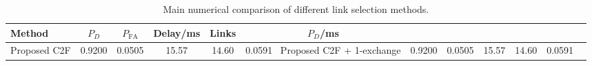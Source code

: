 \begin{table}[t]
    \centering
    \caption{Main numerical comparison of different link selection methods.}
    \label{tab:main_summary}
    \begin{tabular}{l c c c c c}
        \hline
        Method & $P_D$ & $P_{\mathrm{FA}}$ & Delay/ms & Links & $P_D$/ms \\
        \hline
        Proposed C2F & 0.9200 & 0.0505 & 15.57 & 14.60 & 0.0591 \
        Proposed C2F + 1-exchange & 0.9200 & 0.0505 & 15.57 & 14.60 & 0.0591 \
        \hline
    \end{tabular}
\end{table}
